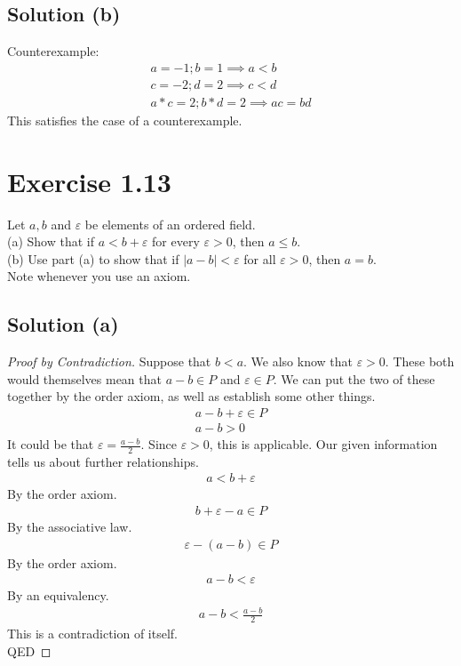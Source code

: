 \documentclass[12pt]{report}
\begin{document}
\subsection{Solution (b)}
Counterexample:
\begin{gather}
    a = -1; b = 1 \implies a < b\\
    c = -2; d = 2 \implies c < d\\
    a * c = 2; b * d = 2 \implies ac = bd
\end{gather}
This satisfies the case of a counterexample.


\pagebreak
\section{Exercise 1.13}
Let $a, b$ and $\varepsilon$ be elements of an ordered field. \\
(a) Show that if $a < b + \varepsilon$ for every $\varepsilon > 0$, then $a \le b$. \\
(b) Use part (a) to show that if $|a - b| < \varepsilon$ for all $\varepsilon > 0$, then $a = b$. \\
Note whenever you use an axiom. 

\subsection{Solution (a)}
\begin{proof}[Proof by Contradiction]
    Suppose that $b < a$.
    We also know that $\varepsilon > 0$.
    These both would themselves mean that $a - b \in P$ and $\varepsilon \in P$.
    We can put the two of these together by the order axiom, as well as establish some other things.
    \begin{gather}
        a - b + \varepsilon \in P\\
        a - b > 0
    \end{gather}
    It could be that $\varepsilon = \frac{a - b}{2}$.
    Since $\varepsilon > 0$, this is applicable.
    Our given information tells us about further relationships.
    \begin{gather}
        a < b + \varepsilon
    \end{gather}
    By the order axiom.
    \begin{gather}
        b + \varepsilon - a \in P
    \end{gather}
    By the associative law.
    \begin{gather}
        \varepsilon - (a - b) \in P
    \end{gather}
    By the order axiom.
    \begin{gather}
        a - b < \varepsilon
    \end{gather}
    By an equivalency.
    \begin{gather}
        a - b < \frac{a - b}{2}
    \end{gather}
    This is a contradiction of itself.\\
    QED
\end{proof}
\end{document}
